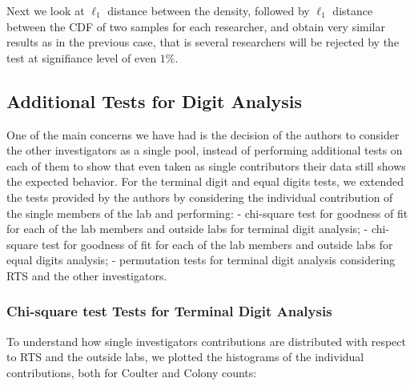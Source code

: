 \documentclass{article}
\begin{document}
Next we look at \(\ell_1\) distance between the density, followed by
\(\ell_1\) distance between the CDF of two samples for each researcher,
and obtain very similar results as in the previous case, that is several
researchers will be rejected by the test at signifiance level of even
\(1 \%\).

    \subsection{Additional Tests for Digit
Analysis}\label{additional-tests-for-digit-analysis}

One of the main concerns we have had is the decision of the authors to
consider the other investigators as a single pool, instead of performing
additional tests on each of them to show that even taken as single
contributors their data still shows the expected behavior. For the
terminal digit and equal digits tests, we extended the tests provided by
the authors by considering the individual contribution of the single
members of the lab and performing: - chi-square test for goodness of fit
for each of the lab members and outside labs for terminal digit
analysis; - chi-square test for goodness of fit for each of the lab
members and outside labs for equal digits analysis; - permutation tests
for terminal digit analysis considering RTS and the other investigators.

    \subsubsection{Chi-square test Tests for Terminal Digit
Analysis}\label{chi-square-test-tests-for-terminal-digit-analysis}

To understand how single investigators contributions are distributed
with respect to RTS and the outside labs, we plotted the histograms of
the individual contributions, both for Coulter and Colony counts:
\end{document}
